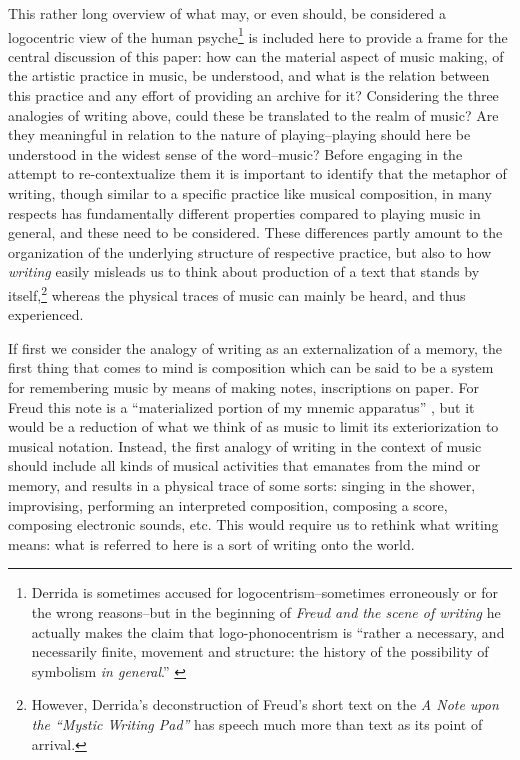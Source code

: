 \documentclass[11pt,a4paper]{article}
\begin{document}
This rather long overview of what may, or even should, be considered a logocentric view of the human psyche\footnote{Derrida is sometimes accused for logocentrism--sometimes erroneously or for the wrong reasons--but in the beginning of \emph{Freud and the scene of writing} he actually makes the claim that logo-phonocentrism is ``rather a necessary, and necessarily finite, movement and structure: the history of the possibility of symbolism \emph{in general}.'' \citep[p. 247]{der78}} is included here to provide a frame for the central discussion of this paper: how can the material aspect of music making, of the artistic practice in music, be understood, and what is the relation between this practice and any effort of providing an archive for it? Considering the three analogies of writing above, could these be translated to the realm of music? Are they meaningful in relation to the nature of playing--playing should here be understood in the widest sense of the word--music? Before engaging in the attempt to re-contextualize them it is important to identify that the metaphor of writing, though similar to a specific practice like musical composition, in many respects has fundamentally different properties compared to playing music in general, and these need to be considered. These differences partly amount to the organization of the underlying structure of respective practice, but also to how \emph{writing} easily misleads us to think about production of a text that stands by itself,\footnote{However, Derrida's deconstruction of Freud's short text on the \emph{A Note upon the “Mystic Writing Pad”} has speech much more than text as its point of arrival.} whereas the physical traces of music can mainly be heard, and thus experienced.

If first we consider the analogy of writing as an externalization of a memory, the first thing that comes to mind is composition which can be said to be a system for remembering music by means of making notes, inscriptions on paper. For Freud this note is a ``materialized portion of my mnemic apparatus'' \citep[p. 207]{freud1997}, but it would be a reduction of what we think of as music to limit its exteriorization to musical notation. Instead, the first analogy of writing in the context of music should include all kinds of musical activities that emanates from the mind or memory, and results in a physical trace of some sorts: singing in the shower, improvising, performing an interpreted composition, composing a score, composing electronic sounds, etc. This would require us to rethink what writing means: what is referred to here is a sort of writing onto the world.
\end{document}
